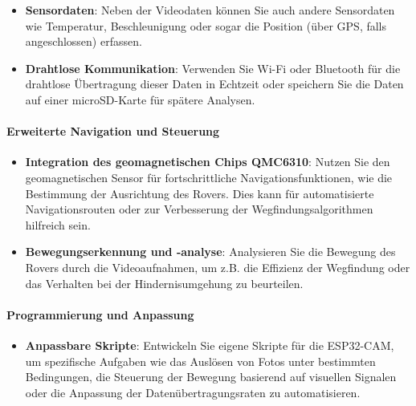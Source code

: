 \documentclass{vorlage-design-main}
\begin{document}
\begin{itemize}

\item
  \textbf{Sensordaten}: Neben der Videodaten können Sie auch andere
  Sensordaten wie Temperatur, Beschleunigung oder sogar die Position
  (über GPS, falls angeschlossen) erfassen.
\item
  \textbf{Drahtlose Kommunikation}: Verwenden Sie Wi-Fi oder Bluetooth
  für die drahtlose Übertragung dieser Daten in Echtzeit oder speichern
  Sie die Daten auf einer microSD-Karte für spätere Analysen.
\end{itemize}

\hypertarget{erweiterte-navigation-und-steuerung}{%
\paragraph{Erweiterte Navigation und
Steuerung}\label{erweiterte-navigation-und-steuerung}}

\begin{itemize}

\item
  \textbf{Integration des geomagnetischen Chips QMC6310}: Nutzen Sie den
  geomagnetischen Sensor für fortschrittliche Navigationsfunktionen, wie
  die Bestimmung der Ausrichtung des Rovers. Dies kann für
  automatisierte Navigationsrouten oder zur Verbesserung der
  Wegfindungsalgorithmen hilfreich sein.
\item
  \textbf{Bewegungserkennung und -analyse}: Analysieren Sie die Bewegung
  des Rovers durch die Videoaufnahmen, um z.B. die Effizienz der
  Wegfindung oder das Verhalten bei der Hindernisumgehung zu beurteilen.
\end{itemize}

\hypertarget{programmierung-und-anpassung}{%
\paragraph{Programmierung und
Anpassung}\label{programmierung-und-anpassung}}

\begin{itemize}

\item
  \textbf{Anpassbare Skripte}: Entwickeln Sie eigene Skripte für die
  ESP32-CAM, um spezifische Aufgaben wie das Auslösen von Fotos unter
  bestimmten Bedingungen, die Steuerung der Bewegung basierend auf
  visuellen Signalen oder die Anpassung der Datenübertragungsraten zu
  automatisieren.
\end{itemize}
\end{document}
